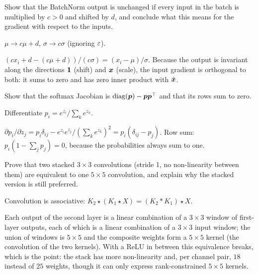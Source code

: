 \begin{problem}\twochili
	Show that the BatchNorm output is unchanged if every input in the batch is multiplied by $c>0$ and shifted by $d$, and conclude what this
	means for the gradient with respect to the inputs.
	\begin{hint}$\mu\to c\mu+d$, $\sigma\to c\sigma$ (ignoring $\varepsilon$).\end{hint}
	\begin{sol}$(cx_i+d-(c\mu+d))/(c\sigma)=(x_i-\mu)/\sigma$. Because the output is invariant along the directions ${\bm{1}}$ (shift) and ${\bm{x}}$
	(scale), the input gradient is orthogonal to both: it sums to zero and has zero inner product with $\hat{{\bm{x}}}$.\end{sol}
\end{problem}

\begin{problem}\twochili
	Show that the softmax Jacobian is $\operatorname{diag}(\bm p)-\bm p\bm p^{\top}$ and that its rows sum to zero.
	\begin{hint}Differentiate $p_i=e^{z_i}/\sum_ke^{z_k}$.\end{hint}
	\begin{sol}$\partial p_i/\partial z_j=p_i\delta_{ij}-e^{z_i}e^{z_j}/(\sum_ke^{z_k})^2=p_i(\delta_{ij}-p_j)$. Row sum:
	$p_i(1-\sum_jp_j)=0$, because the probabilities always sum to one.\end{sol}
\end{problem}

\begin{problem}\threechili
	Prove that two stacked $3\times3$ convolutions (stride 1, no non-linearity between them) are equivalent to one $5\times5$ convolution, and
	explain why the stacked version is still preferred.
	\begin{hint}Convolution is associative: $K_2\star(K_1\star X)=(K_2*K_1)\star X$.\end{hint}
	\begin{sol}Each output of the second layer is a linear combination of a $3\times3$ window of first-layer outputs, each of which is a linear
	combination of a $3\times3$ input window; the union of windows is $5\times5$ and the composite weights form a $5\times5$ kernel (the
	convolution of the two kernels). With a ReLU in between this equivalence breaks, which is the point: the stack has more non-linearity and,
	per channel pair, $18$ instead of $25$ weights, though it can only express rank-constrained $5\times5$ kernels.\end{sol}
\end{problem}

